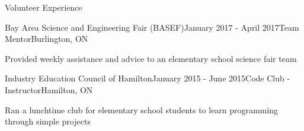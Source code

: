 \documentclass[usenames, dvipsnames]{resume} %
\begin{document}

\begin{rSection}{Volunteer Experience}
	
	\begin{rSubsection}{Bay Area Science and Engineering Fair (BASEF)}{January 2017 - April 2017}{Team Mentor}{Burlington, ON}
		\item Provided weekly assistance and advice to an elementary school science fair team
	\end{rSubsection}
	
	
	\begin{rSubsection}{Industry Education Council of Hamilton}{January 2015 - June 2015}{Code Club - Instructor}{Hamilton, ON}
		\item Ran a lunchtime club for elementary school students to learn programming through simple projects
	\end{rSubsection}
	
	
\end{rSection}

\end{document}
